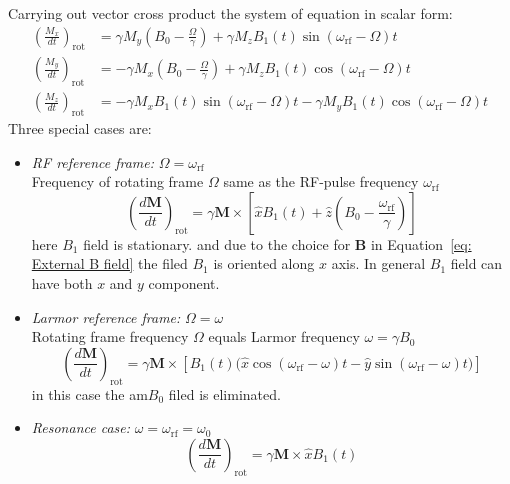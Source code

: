 Carrying out vector cross product the system of equation in scalar form:
\begin{equation}\label{eq: scalar form of Bloch}
\begin{aligned}
	\left(\frac{M_x}{dt}\right)_\mathrm{rot} &= \gamma M_y\left(B_0-\frac{\Omega}{\gamma}\right)+\gamma M_zB_1(t)\sin(\omega_{\text{rf}}-\Omega)t\\
	\left(\frac{M_y}{dt}\right)_\mathrm{rot} &= -\gamma M_x\left(B_0-\frac{\Omega}{\gamma}\right)+\gamma M_zB_1(t)\cos(\omega_{\text{rf}}-\Omega)t\\
	\left(\frac{M_z}{dt}\right)_\mathrm{rot} &= -\gamma M_xB_1(t)\sin(\omega_{\text{rf}}-\Omega)t - \gamma M_yB_1(t)\cos(\omega_{\text{rf}}-\Omega)t
\end{aligned}
\end{equation}
Three special cases are:
\begin{itemize}
	\item \textit{RF reference frame: }$\Omega=\omega_{\text{rf}}$\\
	Frequency of rotating frame $\Omega$ same as the RF-pulse frequency $\omega_{\mathrm{rf}}$
\begin{equation}\label{eq: Bloch case 1}
	\left(\frac{d\mathbf{M}}{dt}\right)_{\text{rot}}=\gamma\mathbf{M}\times\left[\hat{x}B_1(t)+\hat{z}\left(B_0-\frac{\omega_{\text{rf}}}{\gamma}\right)\right]	
\end{equation}
here $B_1$ field is stationary. and due to the choice for $\mathbf{B}$ in Equation~\ref{eq: External B field} the filed $B_1$ is oriented along $x$ axis. 
In general $B_1$ field can have both $x$ and $y$ component.
\item \textit{Larmor reference frame: }$\Omega=\omega$\\
Rotating frame frequency $\Omega$ equals Larmor frequency $\omega = \gamma B_{0}$
\begin{equation}\label{eq: Bloch case 2}
	\left(\frac{d\mathbf{M}}{dt}\right)_{\text{rot}}=\gamma\mathbf{M}\times\left[B_1(t)(\hat{x}\cos{(\omega_{\text{rf}}-\omega)}t-\hat{y}\sin{(\omega_{\text{rf}}-\omega)t)}\right]
\end{equation}
in this case the am$B_0$ filed is eliminated.
\item \textit{Resonance case:} $\omega=\omega_{\text{rf}}=\omega_{0}$
\begin{equation}\label{eq: Bloch case 3}
	\left(\frac{d\mathbf{M}}{dt}\right)_{\text{rot}}=\gamma\mathbf{M}\times \hat{x}B_1(t)
\end{equation}
\end{itemize}
